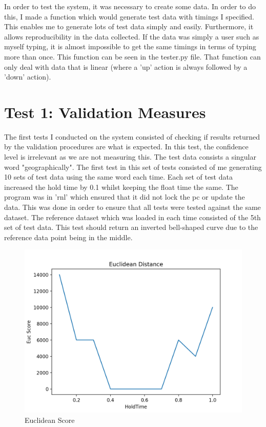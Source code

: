 \documentclass[10pt,a4paper]{report}
\begin{document}
In order to test the system, it was necessary to create some data. In order to do this, I made a function which would generate test data with timings I specified. This enables me to generate lots of test data simply and easily. Furthermore, it allows reproducibility in the data collected. If the data was simply a user such as myself typing, it is almost impossible to get the same timings in terms of typing more than once. This function can be seen in the tester.py file. That function can only deal with data that is linear (where a 'up' action is always followed by a 'down' action).


\section{Test 1: Validation Measures}

The first tests I conducted on the system consisted of checking if results returned by the validation procedures are what is expected. In this test, the confidence level is irrelevant as we are not measuring this. The test data consists a singular word "geographically". The first test in this set of tests consisted of me generating 10 sets of test data using the same word each time. Each set of test data increased the hold time by 0.1 whilst keeping the float time the same. The program was in 'rnl' which ensured that it did not lock the pc or update the data. This was done in order to ensure that all tests were tested against the same dataset. The reference dataset which was loaded in each time consisted of the 5th set of test data. This test should return an inverted bell-shaped curve due to the reference data point being in the middle. 

\begin{figure}
	\centering
	\includegraphics[scale=0.6]{EUCGraph}
	\caption{Euclidean Score}
	\label{fig:EucGraph}
\end{figure}
\end{document}
